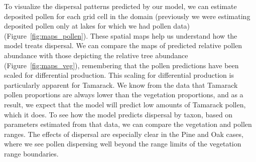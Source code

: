 \documentclass[12pt]{article}
\begin{document}



To visualize the dispersal patterns predicted by our model, we can
estimate deposited pollen for each grid cell in the domain (previously
we were estimating deposited pollen only at lakes for which we had
pollen data) (Figure~\ref{fig:maps_pollen}). These spatial maps help
us understand how the model treats dispersal. We can compare the maps
of predicted relative pollen abundance with those depicting the
relative tree abundance (Figure~\ref{fig:maps_veg}), remembering that the pollen predictions have
been scaled for differential production. This scaling for differential
production is particularly apparent for Tamarack. We know from the
data that Tamarack pollen proportions are always lower than the
vegetation proportions, and as a result, we expect that the model will
predict low amounts of Tamarack pollen, which it does. To see how the
model predicts dispersal by taxon, based on parameters estimated from
that data, we can compare the vegetation and pollen ranges. The
effects of dispersal are especially clear in the Pine and Oak cases,
where we see pollen dispersing well beyond the range limits of the
vegetation range boundaries.





\end{document}
